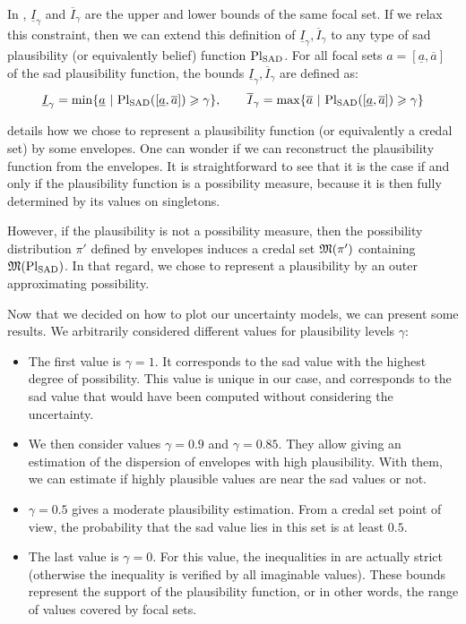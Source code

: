 In , $\underline{I}_\gamma$ and $\overline{I}_\gamma$ are the upper and lower bounds of the same focal set. If we relax this constraint, then we can extend this definition of $\underline{I}_\gamma, \overline{I}_\gamma$ to any type of \acrshort{sad} plausibility (or equivalently belief) function $\mathrm{Pl}_{\mathrm{SAD}}$. For all focal sets $a=[\underline{a}, \overline{a}]$ of the \acrshort{sad} plausibility function, the bounds $\underline{I}_\gamma, \overline{I}_\gamma$ are defined as:
\begin{align}\label{eq:belief_bounds}
    \underline{I}_\gamma = \min\{\underline{a} ~|~ \mathrm{Pl}_{\mathrm{SAD}}([\underline{a}, \overline{a}])\geqslant\gamma\}, \qquad \overline{I}_\gamma = \max\{\overline{a} ~|~ \mathrm{Pl}_{\mathrm{SAD}}([\underline{a}, \overline{a}])\geqslant\gamma\}
\end{align}

\begin{remark}
     details how we chose to represent a plausibility function (or equivalently a credal set) by some envelopes. One can wonder if we can reconstruct the plausibility function from the envelopes. It is straightforward to see that it is the case if and only if the plausibility function is a possibility measure, because it is then fully determined by its values on singletons.
    
    However, if the plausibility is not a possibility measure, then the possibility distribution $\pi'$ defined by envelopes induces a credal set $\mathfrak{M}(\pi')$ containing $\mathfrak{M}(\mathrm{Pl}_{\mathrm{SAD}})$. In that regard, we chose to represent a plausibility by an outer approximating possibility.
\end{remark}
Now that we decided on how to plot our uncertainty models, we can present some results. We arbitrarily considered different values for plausibility levels $\gamma$:
\begin{itemize}
    \item The first value is $\gamma=1$. It corresponds to the \acrshort{sad} value with the highest degree of possibility. This value is unique in our case, and corresponds to the \acrshort{sad} value that would have been computed without considering the uncertainty.
    \item We then consider values $\gamma=0.9$ and $\gamma=0.85$. They allow giving an estimation of the dispersion of envelopes with high plausibility. With them, we can estimate if highly plausible values are near the \acrshort{sad} values or not.
    \item $\gamma=0.5$ gives a moderate plausibility estimation. From a credal set point of view, the probability that the \acrshort{sad} value lies in this set is at least $0.5$.
    \item The last value is $\gamma=0$. For this value, the inequalities in  are actually strict (otherwise the inequality is verified by all imaginable values). These bounds represent the support of the plausibility function, or in other words, the range of values covered by focal sets.
\end{itemize}

